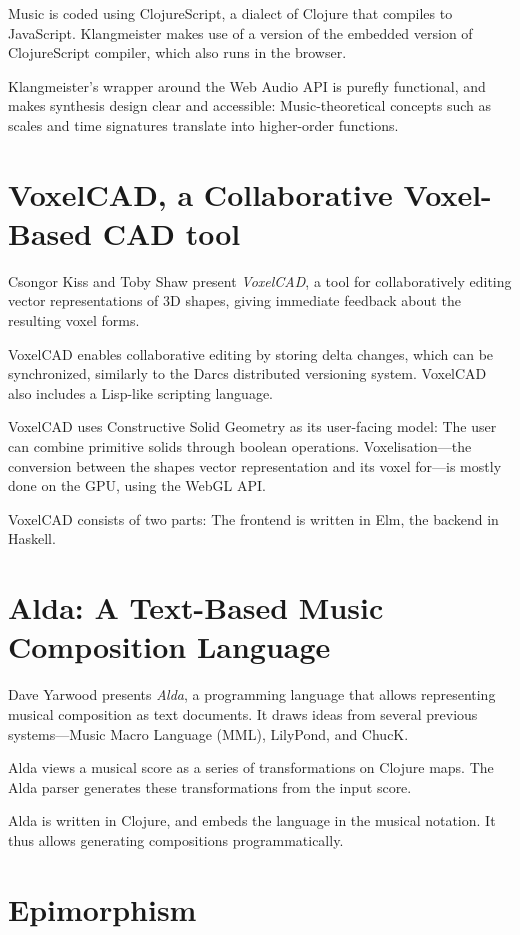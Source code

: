 \documentclass{sigplanconf}
\begin{document}
Music is coded using ClojureScript, a dialect of Clojure that
compiles to JavaScript.  Klangmeister makes use of a version of the
embedded version of ClojureScript compiler, which also runs in the
browser.

Klangmeister's wrapper around the Web Audio API is purefly functional,
and makes synthesis design clear and accessible:  Music-theoretical
concepts such as scales and time signatures translate into
higher-order functions.

\section{VoxelCAD, a Collaborative Voxel-Based CAD tool}

Csongor Kiss and Toby Shaw present \textit{VoxelCAD}, a tool for
collaboratively editing vector representations of 3D shapes, giving
immediate feedback about the resulting voxel forms.

VoxelCAD enables collaborative editing by storing delta changes, which
can be synchronized, similarly to the Darcs distributed versioning
system.  VoxelCAD also includes a Lisp-like scripting language.

VoxelCAD uses Constructive Solid Geometry as its user-facing model:
The user can combine primitive solids through boolean operations.
Voxelisation---the conversion between the shapes vector representation
and its voxel for---is mostly done on the GPU, using the WebGL API.

VoxelCAD consists of two parts: The frontend is written in Elm, the
backend in Haskell.

\section{Alda: A Text-Based Music Composition Language}

Dave Yarwood presents \textit{Alda}, a programming language that
allows representing musical composition as text documents.  It draws
ideas from several previous systems---Music Macro Language (MML),
LilyPond,  and ChucK.

Alda views a musical score as a series of transformations on Clojure
maps.  The Alda parser generates these transformations from the input
score.

Alda is written in Clojure, and embeds the language in the musical
notation.  It thus allows generating compositions programmatically.

\section{Epimorphism}
\end{document}
